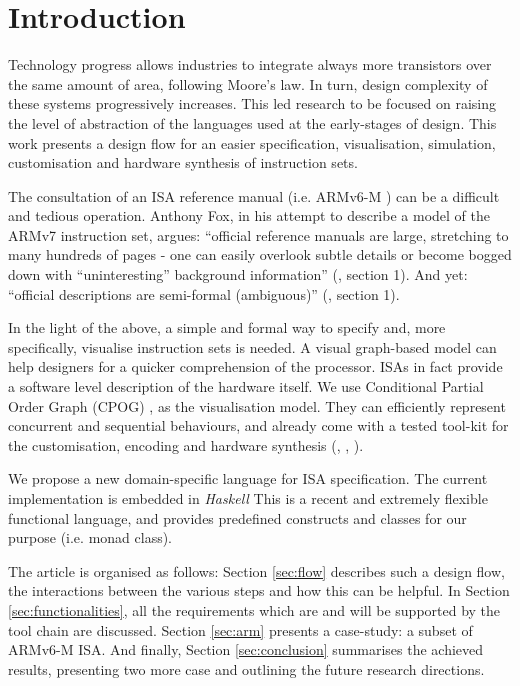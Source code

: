 \documentclass[conference]{IEEEtran}
\begin{document}
\section{Introduction}
\label{sec:intro}
Technology progress allows industries to integrate always more transistors over the same amount of area, following Moore's law. In turn, design complexity of these systems progressively increases. This led research to be focused on raising the level of abstraction of the languages used at the early-stages of design. This work presents a design flow for an easier specification, visualisation, simulation, customisation and hardware synthesis of instruction sets.

The consultation of an ISA reference manual (i.e. ARMv6-M \cite{armManual}) can be a difficult and tedious operation. Anthony Fox, in his attempt to describe a model of the ARMv7 instruction set, argues: ``official reference manuals are large, stretching to many hundreds of pages - one can easily overlook subtle details or become bogged down with ``uninteresting'' background information'' (\cite{armv7}, section 1). And yet: ``official descriptions are semi-formal (ambiguous)'' (\cite{armv7}, section 1). 

In the light of the above, a simple and formal way to specify and, more specifically, visualise instruction sets is needed. A visual graph-based model can help designers for a quicker comprehension of the processor. ISAs in fact provide a software level description of the hardware itself. We use Conditional Partial Order Graph (CPOG) \cite{cpog},\cite{andreyPhd} as the visualisation model. They can efficiently represent concurrent and sequential behaviours, and already come with a tested tool-kit for the customisation, encoding and hardware synthesis (\cite{workcraft}, \cite{satEncoding}, \cite{acsd}).

We propose a new domain-specific language for ISA specification. The current implementation is embedded in \textit{Haskell} This is a recent and extremely flexible functional language, and provides predefined constructs and classes for our purpose (i.e. monad class).

The article is organised as follows: Section \ref{sec:flow} describes such a design flow, the interactions between the various steps and how this can be helpful. In Section \ref{sec:functionalities}, all the requirements which are and will be supported by the tool chain are discussed. Section \ref{sec:arm} presents a case-study: a subset of ARMv6-M ISA. And finally, Section \ref{sec:conclusion} summarises the achieved results, presenting two more case and outlining the future research directions.
\end{document}
